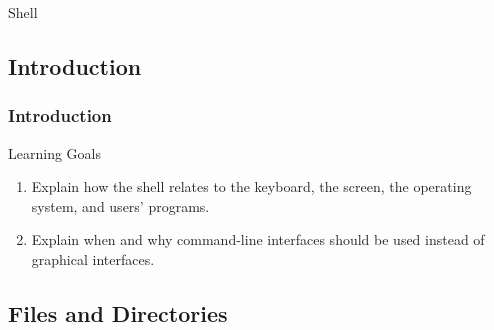 \documentclass[xcolor=dvipsnames]{beamer}
\begin{document}
\begin{frame}
\begin{center}{\Huge Shell}
\end{center}
\end{frame}

\subsection*{Introduction}

\begin{frame}
\frametitle{Introduction}
Learning Goals
\begin{enumerate}

 \item   Explain how the shell relates to the keyboard, the screen, the operating system, and users' programs.
 \item   Explain when and why command-line interfaces should be used instead of graphical interfaces.

\end{enumerate}

\end{frame}

\subsection*{Files and Directories}
\end{document}
